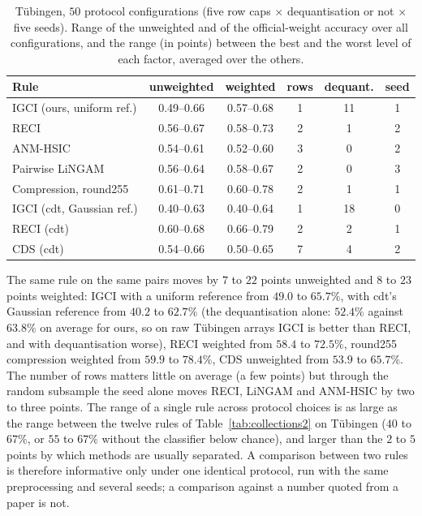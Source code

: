 \begin{table}[t]
\caption{T\"ubingen, $50$ protocol configurations (five row caps $\times$ dequantisation or not $\times$ five seeds). Range of the unweighted and of the official-weight accuracy over all configurations, and the range (in points) between the best and the worst level of each factor, averaged over the others.}
\label{tab:protocol}
\small
\begin{tabular}{@{}lccccc@{}}
\toprule
Rule & unweighted & weighted & rows & dequant. & seed\\
\midrule
IGCI (ours, uniform ref.) & 0.49--0.66 & 0.57--0.68 & 1 & 11 & 1\\
RECI & 0.56--0.67 & 0.58--0.73 & 2 & 1 & 2\\
ANM-HSIC & 0.54--0.61 & 0.52--0.60 & 3 & 0 & 2\\
Pairwise LiNGAM & 0.56--0.64 & 0.58--0.67 & 2 & 0 & 3\\
Compression, round255 & 0.61--0.71 & 0.60--0.78 & 2 & 1 & 1\\
IGCI (cdt, Gaussian ref.) & 0.40--0.63 & 0.40--0.64 & 1 & 18 & 0\\
RECI (cdt) & 0.60--0.68 & 0.66--0.79 & 2 & 2 & 1\\
CDS (cdt) & 0.54--0.66 & 0.50--0.65 & 7 & 4 & 2\\
\bottomrule
\end{tabular}
\end{table}

The same rule on the same pairs moves by $7$ to $22$ points unweighted and $8$ to $23$ points weighted: IGCI with a uniform reference from $49.0$ to $65.7\%$, with cdt's Gaussian reference from $40.2$ to $62.7\%$ (the dequantisation alone: $52.4\%$ against $63.8\%$ on average for ours, so on raw T\"ubingen arrays IGCI is better than RECI, and with dequantisation worse), RECI weighted from $58.4$ to $72.5\%$, round255 compression weighted from $59.9$ to $78.4\%$, CDS unweighted from $53.9$ to $65.7\%$. The number of rows matters little on average (a few points) but through the random subsample the seed alone moves RECI, LiNGAM and ANM-HSIC by two to three points. The range of a single rule across protocol choices is as large as the range between the twelve rules of Table~\ref{tab:collections2} on T\"ubingen ($40$ to $67\%$, or $55$ to $67\%$ without the classifier below chance), and larger than the $2$ to $5$ points by which methods are usually separated. A comparison between two rules is therefore informative only under one identical protocol, run with the same preprocessing and several seeds; a comparison against a number quoted from a paper is not.
